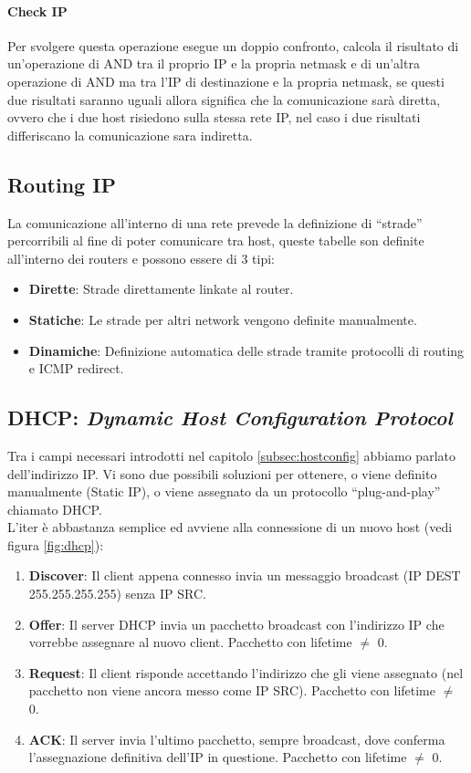 \documentclass[12pt]{article}
\begin{document}
\paragraph{Check IP} Per svolgere questa operazione esegue un doppio confronto, calcola il risultato di un'operazione di AND tra il proprio IP e la propria netmask e di un'altra operazione di AND ma tra l'IP di destinazione e la propria netmask, se questi due risultati saranno uguali allora significa che la comunicazione sarà diretta, ovvero che i due host risiedono sulla stessa rete IP, nel caso i due risultati differiscano la comunicazione sara indiretta.

\subsection{Routing IP}
La comunicazione all'interno di una rete prevede la definizione di ``strade'' percorribili al fine di poter comunicare tra host, queste tabelle son definite all'interno dei routers e possono essere di 3 tipi:
\begin{itemize}
  \item \textbf{Dirette}: Strade direttamente linkate al router.
  \item \textbf{Statiche}: Le strade per altri network vengono definite manualmente.
  \item \textbf{Dinamiche}: Definizione automatica delle strade tramite protocolli di routing e ICMP redirect.
\end{itemize}

\subsection{DHCP: \textit{Dynamic Host Configuration Protocol}} %
Tra i campi necessari introdotti nel capitolo \ref{subsec:hostconfig} abbiamo parlato dell'indirizzo IP. Vi sono due possibili soluzioni per ottenere, o viene definito manualmente (Static IP), o viene assegnato da un protocollo ``plug-and-play'' chiamato DHCP.\\
L'iter è abbastanza semplice ed avviene alla connessione di un nuovo host (vedi figura \ref{fig:dhcp}):
\begin{enumerate}
  \item \textbf{Discover}: Il client appena connesso invia un messaggio broadcast (IP DEST 255.255.255.255) senza IP SRC.
  \item \textbf{Offer}: Il server DHCP invia un pacchetto broadcast con l'indirizzo IP che vorrebbe assegnare al nuovo client. Pacchetto con lifetime $\neq$ 0.
  \item \textbf{Request}: Il client risponde accettando l'indirizzo che gli viene assegnato (nel pacchetto non viene ancora messo come IP SRC). Pacchetto con lifetime $\neq$ 0.
  \item \textbf{ACK}: Il server invia l'ultimo pacchetto, sempre broadcast, dove conferma l'assegnazione definitiva dell'IP in questione. Pacchetto con lifetime $\neq$ 0.
\end{enumerate}
\end{document}
